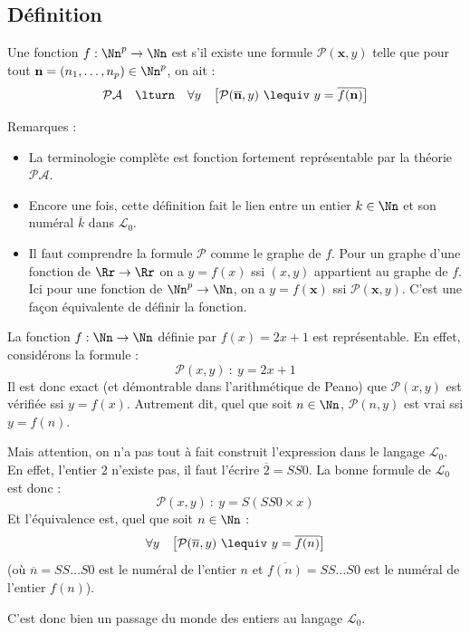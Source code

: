 \documentclass[11pt,class=report,crop=false]{standalone}
\begin{document}
\subsection{Définition} 

\begin{definition}
    Une fonction $f : \Nn^p \to \Nn$ est  s'il existe une formule $\mathcal{P}(\mathbf{x}, y)$ telle que pour tout $\mathbf{n} = (n_1, \dots, n_p) \in \Nn^p$, on ait :
    \[ \mathcal{PA} \quad \lturn \quad \forall y \quad \big[ \mathcal{P}(\overline{\mathbf{n}}, y) \ \lequiv \  y = \overline{f(\mathbf{n})} \big] \]
\end{definition}

Remarques :
\begin{itemize}
    \item La terminologie complète est \og{}fonction fortement représentable par la théorie $\mathcal{PA}$\fg{}.

    \item Encore une fois, cette définition fait le lien entre un entier $k \in \Nn$ et son numéral $\overline{k}$ dans $\mathcal{L}_0$.

    \item Il faut comprendre la formule $\mathcal{P}$ comme le graphe de $f$.
    Pour un graphe d'une fonction de $\Rr \to \Rr$ on a $y=f(x)$ ssi $(x,y)$ appartient au graphe de $f$.
    Ici pour une fonction de $\Nn^p \to \Nn$, on a $y=f(\mathbf{x})$ ssi $\mathcal{P}(\mathbf{x},y)$.
    C'est une façon équivalente de définir la fonction.
\end{itemize}


\begin{exemple}
    La fonction $f : \Nn \to \Nn$ définie par $f(x) = 2x+1$ est représentable.
    En effet, considérons la formule :
    \[ \mathcal{P}(x,y) \ : \ y = 2x+1 \]
    Il est donc exact (et démontrable dans l'arithmétique de Peano) que $\mathcal{P}(x,y)$ est vérifiée ssi $y=f(x)$.
    Autrement dit, quel que soit $n \in \Nn$, $\mathcal{P}(n,y)$ est vrai ssi $y=f(n)$.

    Mais attention, on n'a pas tout à fait construit l'expression dans le langage $\mathcal{L}_0$. En effet, l'entier $2$ n'existe pas, il faut l'écrire $\overline{2} = SS0$. La bonne formule de $\mathcal{L}_0$ est donc :
    \[ \mathcal{P}(x,y) \ : \ y = S(SS0 \times x) \]
    Et l'équivalence est, quel que soit $n \in \Nn$ :
    \[ \forall y \quad \big[ \mathcal{P}(\overline{n}, y) \ \lequiv \ y = \overline{f(n)} \big] \]
    (où $\overline{n} = SS \dots S0$ est le numéral de l'entier $n$ et $\overline{f(n)} = SS \dots S0$ est le numéral de l'entier $f(n)$).
    
    C'est donc bien un passage du monde des entiers au langage $\mathcal{L}_0$.
\end{exemple}
\end{document}
